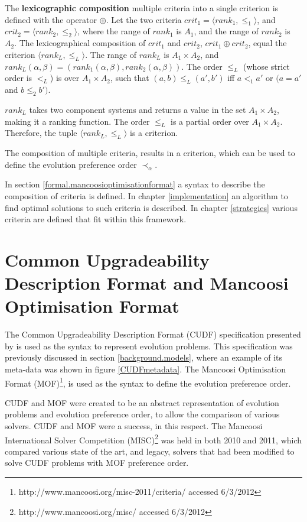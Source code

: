 \begin{defs}
\label{formal.defcritlex}
The \textbf{lexicographic composition} multiple criteria into a single criterion is defined with the operator $\oplus$.
Let the two criteria $crit_1 = \langle rank_1, \leq_{1} \rangle$, and $crit_2 = \langle rank_2, \leq_{2} \rangle$,
where the range of $rank_1$ is $A_1$, and the range of $rank_2$ is $A_2$.
The lexicographical composition of $crit_1$ and $crit_2$, $crit_1 \oplus crit_2$, equal the criterion $\langle rank_L,\leq_L \rangle$.
The range of $rank_L$ is $A_1 \times A_2$, and $rank_L(\alpha,\beta) = (rank_1(\alpha,\beta),rank_2(\alpha,\beta))$.
The order $\leq_L$ (whose strict order is $<_L$) is over $A_1 \times A_2$, such that $(a,b) \leq_L (a',b')$ iff $a <_1 a'$ or $(a = a'$ and $b \leq_2 b')$.
\end{defs}
$rank_L$ takes two component systems and returns a value in the set $A_1 \times A_2$, making it a ranking function.
The order $\leq_L$ is a partial order \citep{Schroder2003} over $A_1 \times A_2$.
Therefore, the tuple $\langle rank_L,\leq_L \rangle$ is a criterion.

The composition of multiple criteria, results in a criterion, which can be used to define the evolution preference order $\prec_{\alpha}$.

In section \ref{formal.mancoosioptimisationformat} a syntax to describe the composition of criteria is defined. 
In chapter \ref{implementation} an algorithm to find optimal solutions to such criteria is described.
In chapter \ref{strategies} various criteria are defined that fit within this framework.

\section{Common Upgradeability Description Format and Mancoosi Optimisation Format}
\label{formal.cudf}
The Common Upgradeability Description Format (CUDF) specification presented by \citep{treinen2009common} is used as the syntax to represent evolution problems.
This specification was previously discussed in section \ref{background.models}, where an example of its meta-data was shown in figure \ref{CUDFmetadata}.
The Mancoosi Optimisation Format (MOF)\footnote{http://www.mancoosi.org/misc-2011/criteria/ accessed 6/3/2012}, is used as the syntax to define the evolution preference order.

CUDF and MOF were created to be an abstract representation of evolution problems and evolution preference order, to allow the comparison of various solvers.
CUDF and MOF were a success, in this respect.
The Mancoosi International Solver Competition (MISC)\footnote{http://www.mancoosi.org/misc/ accessed 6/3/2012} was held in both 2010 and 2011,
which compared various state of the art, and legacy, solvers that had been modified to solve CUDF problems with MOF preference order.

